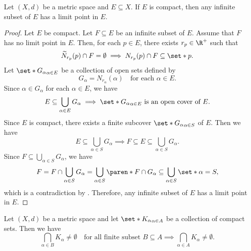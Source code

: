 \bigskip

\begin{theorem} \label{thm:InfiniteSubsetOfCompactSetHasLimitPoint}
    Let $(X, d)$ be a metric space and $E \subseteq X$. If $E$ is compact,
    then any infinite subset of $E$ has a limit point in $E$.
\end{theorem}

\begin{proof}
    Let $E$ be compact. Let $F \subseteq E$ be an infinite subset of $E$. Assume that $F$ has
    no limit point in $E$. Then, for each $p \in E$, there exists $r_{p} \in \R^{+}$ such that
    \[
    \widetilde{N}_{r_{p}}(p) \cap F = \emptyset \implies N_{r_{p}}(p) \cap F \subseteq \set*{p}.
    \]
    Let $\set*{G_{\alpha}}_{\alpha \in E}$ be a collection of open sets defined by
    \[
    G_{\alpha} = N_{r_{\alpha}}(\alpha) \quad \text{for each } \alpha \in E.
    \]
    Since $\alpha \in G_{\alpha}$ for each $\alpha \in E$, we have
    \[
    E \subseteq \bigcup_{\alpha \in E} G_{\alpha} \implies \set*{G_{\alpha}}_{\alpha \in E} \text{ is an open cover of } E.
    \]
    Since $E$ is compact, there exists a finite subcover $\set*{G_{\alpha}}_{\alpha \in S}$ of $E$. Then we have
    \[
    E \subseteq \bigcup_{\alpha \in S} G_{\alpha} \implies F \subseteq E \subseteq \bigcup_{\alpha \in S} G_{\alpha}.
    \]
    Since $F \subseteq \displaystyle \bigcup_{\alpha \in S} G_{\alpha}$, we have
    \[
    F = F \cap \bigcup_{\alpha \in S} G_{\alpha} = \bigcup_{\alpha \in S} \paren*{F \cap G_{\alpha}}
    \subseteq \bigcup_{\alpha \in S} \set*{\alpha} = S,
    \]
    which is a contradiction by .
    Therefore, any infinite subset of $E$ has a limit point in $E$.
\end{proof}

\bigskip

\begin{theorem} \label{thm:FiniteCompactIntersectionProperty}
    Let $(X, d)$ be a metric space and let $\set*{K_{\alpha}}_{\alpha \in A}$ be a collection of compact sets. Then we have
    \[
    \bigcap_{\alpha \in B} K_{\alpha} \neq \emptyset \quad \text{for all finite subset }
    B \subseteq A \implies \bigcap_{\alpha \in A} K_{\alpha} \neq \emptyset.
    \]
\end{theorem}

